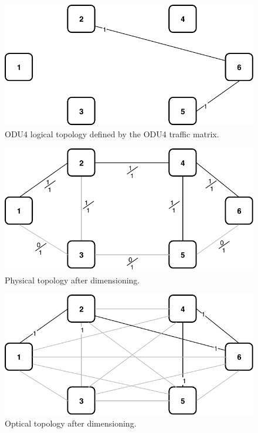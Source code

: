 \begin{figure}[h!]
\centering
\includegraphics[width=12cm]{sdf/ilp/translucent_survivability/figures/logical_topology_ODU4_low}
\caption{ODU4 logical topology defined by the ODU4 traffic matrix.}
\label{logical3_ODU4_low}
\end{figure}
\newpage
\begin{figure}[h!]
\centering
\includegraphics[width=12cm]{sdf/ilp/translucent_survivability/figures/physical_topology_low}
\caption{Physical topology after dimensioning.}
\label{physical3_low}
\end{figure}

\vspace{13pt}
\begin{figure}[h!]
\centering
\includegraphics[width=12cm]{sdf/ilp/translucent_survivability/figures/optical_topology_low}
\caption{Optical topology after dimensioning.}
\label{optical3_low}
\end{figure}

